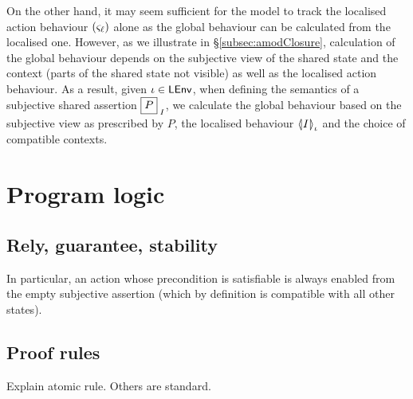 On the other hand, it may seem sufficient for the model to track the localised action behaviour $(\amod{\ell})$ alone as the global behaviour can be calculated from the localised one. However, as we illustrate in \S\ref{subsec:amodClosure}, calculation of the global behaviour depends on the subjective view of the shared state and the context (parts of the shared state not visible) as well as the localised action behaviour. As a result, given $\lenv \in \LEnv$, when defining the semantics of a subjective shared assertion $\shared{P}{I}$, we calculate the global behaviour based on the subjective view as prescribed by $P$, the localised behaviour $\semI[\lenv]{I}$ and the choice of compatible contexts. 


\section{Program logic}

\subsection{Rely, guarantee, stability}

In particular,
an action whose precondition is satisfiable is always enabled from the
empty subjective assertion (which by definition is compatible with all
other states). 


\subsection{Proof rules}

Explain atomic rule. Others are standard.

